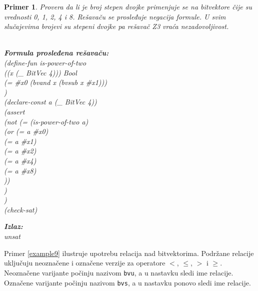 \documentclass[12pt,oneside]{memoir}
\newcommand\tab[1][0.5cm]{\hspace*{#1}}
\newtheorem{primer}{Primer}
\begin{document}
\begin{primer} \label{example8}
Provera da li je broj stepen dvojke primenjuje se na bitvektore čije su vrednosti 0, 1, 2, 4 i 8. Rešavaču se prosleđuje negacija formule. U svim slučajevima brojevi su stepeni dvojke pa rešavač Z3 vraća nezadovoljivost.\\ \\
\begin{minipage}[b]{0.5\textwidth}
\textbf{Formula prosleđena rešavaču:}
\\(define-fun is-power-of-two 
\\\tab((x (\_ BitVec 4))) Bool 
\\\tab(= \#x0 (bvand x (bvsub x \#x1)))
\\)
\\(declare-const a (\_ BitVec 4))
\\(assert 
\\\tab(not (= (is-power-of-two a) 
\\\tab\tab    (or (= a \#x0) 
\\\tab\tab\tab     (= a \#x1) 
\\\tab\tab\tab     (= a \#x2) 
\\\tab\tab\tab     (= a \#x4) 
\\\tab\tab\tab     (= a \#x8)
\\\tab\tab		))
\\\tab )
\\)
\\(check-sat)
\end{minipage}
\hspace{2.5cm}
\begin{minipage}[t]{0.5\textwidth}
\vspace{-10.45cm}
\textbf{Izlaz:}
\\unsat
\end{minipage}
\end{primer}
\par Primer \ref{example9} ilustruje upotrebu relacija nad bitvektorima. Podržane relacije uključuju neoznačene i označene verzije za operatore $<$, $\leq$, $>$ i $\geq$. Neoznačene varijante počinju nazivom \texttt{bvu}, a u nastavku sledi ime relacije. Označene varijante počinju nazivom \texttt{bvs}, a u nastavku ponovo sledi ime relacije. 
\end{document}
